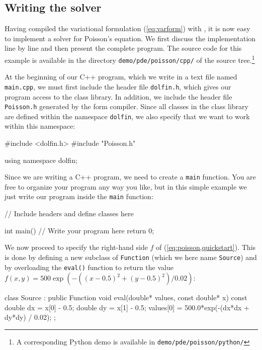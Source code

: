 \subsection{Writing the solver}

Having compiled the variational formulation (\ref{eq:varform}) with
\ffc{}, it is now easy to implement a solver for Poisson's
equation. We first discuss the implementation line by line and then
present the complete program. The source code for this example is
available in the directory \texttt{demo/pde/poisson/cpp/} of the
\dolfin{} source tree.\footnote{A corresponding Python demo is available in \texttt{demo/pde/poisson/python/}}

At the beginning of our C++ program, which we write in a text file
named \texttt{main.cpp}, we must first include the header file
\texttt{dolfin.h}, which gives our program access to the \dolfin{}
class library. In addition, we include the header file
\texttt{Poisson.h} generated by the form compiler. Since all classes
in the \dolfin{} class library are defined within the namespace
\texttt{dolfin}, we also specify that we want to work within this
namespace:
\begin{code}
#include <dolfin.h>
#include "Poisson.h"
  
using namespace dolfin;
\end{code}

Since we are writing a C++ program, we need to create a \texttt{main}
function.  You are free to organize your program any way you like, but
in this simple example we just write our program inside the
\texttt{main} function:

\begin{code}
// Include headers and define classes here

int main()
{
  // Write your program here
  return 0;
}
\end{code}

We now proceed to specify the right-hand side $f$ of
(\ref{eq:poisson,quickstart}). This is done by defining a new subclass
of \texttt{Function} (which we here name \texttt{Source}) and
by overloading the \texttt{eval()} function to return the value $f(x, y)
= 500 \exp(-((x-0.5)^2 + (y-0.5)^2)/0.02)$:
\begin{code}
class Source : public Function
{
  void eval(double* values, const double* x) const
  {
    double dx = x[0] - 0.5;
    double dy = x[1] - 0.5;
    values[0] = 500.0*exp(-(dx*dx + dy*dy) / 0.02);
  }
};
\end{code}

